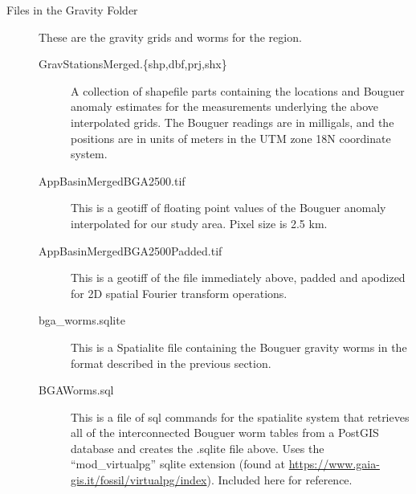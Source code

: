 \documentclass[extra]{article}
\begin{document}
\begin{description}

\item[Files in the Gravity Folder] These are the gravity grids and worms for the region. 
\begin{description}
\item [GravStationsMerged.\{shp,dbf,prj,shx\}] A collection of shapefile parts containing the locations and Bouguer anomaly estimates for the measurements underlying the above interpolated grids. The Bouguer readings are in milligals, and the positions are in units of meters in the UTM zone 18N coordinate system.

\item [AppBasinMergedBGA2500.tif] This is a geotiff \citep[see, e.g. ][]{GDAL} of floating point values of the Bouguer anomaly interpolated for our study area. Pixel size is 2.5 km.
\item [AppBasinMergedBGA2500Padded.tif] This is a geotiff of the file immediately above, padded and apodized for 2D spatial Fourier transform operations. 
\item [bga\_worms.sqlite] This is a Spatialite \citep{Spatialite2015} file containing the Bouguer gravity worms in the format described in the previous section.
\item[BGAWorms.sql] This is a file of sql commands for the spatialite system \citep{Spatialite2015} that retrieves all of the interconnected Bouguer worm tables from a PostGIS database and creates the .sqlite file above. Uses the ``mod\_virtualpg'' sqlite extension (found at \url{https://www.gaia-gis.it/fossil/virtualpg/index}). Included here for reference. 

\end{description}


\end{description}
\end{document}
